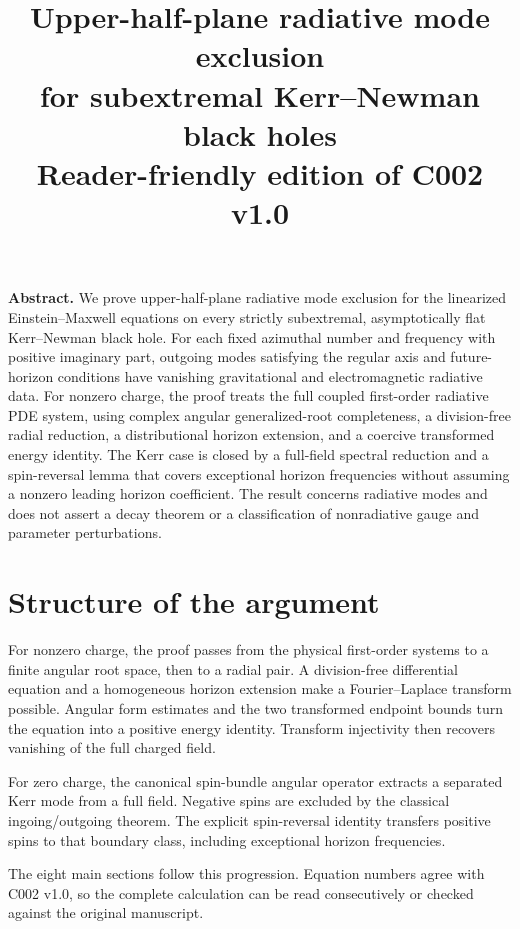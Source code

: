 \documentclass[11pt,a4paper]{article}
\title{\vspace{-1.2em}Upper-half-plane radiative mode exclusion\\for subextremal Kerr--Newman black holes\\[.65em]\large Reader-friendly edition of C002 v1.0}
\author{}
\date{}
\begin{document}
\maketitle
\vspace{-1.5em}


\textbf{Abstract.} We prove upper-half-plane radiative mode exclusion
for the linearized Einstein--Maxwell equations on every strictly
subextremal, asymptotically flat Kerr--Newman black hole. For each fixed
azimuthal number and frequency with positive imaginary part, outgoing
modes satisfying the regular axis and future-horizon conditions have
vanishing gravitational and electromagnetic radiative data. For nonzero
charge, the proof treats the full coupled first-order radiative PDE
system, using complex angular generalized-root completeness, a
division-free radial reduction, a distributional horizon extension, and
a coercive transformed energy identity. The Kerr case is closed by a
full-field spectral reduction and a spin-reversal lemma that covers
exceptional horizon frequencies without assuming a nonzero leading
horizon coefficient. The result concerns radiative modes and does not
assert a decay theorem or a classification of nonradiative gauge and
parameter perturbations.


\section*{Structure of the argument}
For nonzero charge, the proof passes from the physical first-order systems to a finite angular root space, then to a radial pair. A division-free differential equation and a homogeneous horizon extension make a Fourier--Laplace transform possible. Angular form estimates and the two transformed endpoint bounds turn the equation into a positive energy identity. Transform injectivity then recovers vanishing of the full charged field.

For zero charge, the canonical spin-bundle angular operator extracts a separated Kerr mode from a full field. Negative spins are excluded by the classical ingoing/outgoing theorem. The explicit spin-reversal identity transfers positive spins to that boundary class, including exceptional horizon frequencies.

The eight main sections follow this progression. Equation numbers agree with C002 v1.0, so the complete calculation can be read consecutively or checked against the original manuscript.
\clearpage
{\small\setlength{\parskip}{1pt}\tableofcontents}
\clearpage
\end{document}
